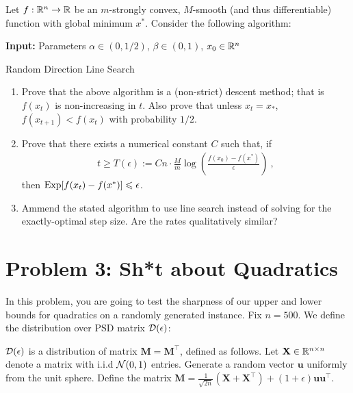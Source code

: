 \documentclass[12pt]{article}
\begin{document}
	Let $f: \mathbb{R}^n \to \mathbb{R}$ be an $m$-strongly convex, $M$-smooth (and thus differentiable) function with global minimum $x^*$. 
%
	Consider the following algorithm:

	\begin{algorithm}[H]
	\SetAlgoLined
	\textbf{Input:} Parameters $\alpha \in (0,1/2)$, $\beta \in (0,1)$, $x_0 \in \mathbb{R}^n$\;
	\caption{Random Direction Line Search}
	\end{algorithm}

\begin{enumerate}
	\item Prove that the above algorithm is a (non-strict) descent method; that is $f(x_t)$ is non-increasing in $t$. Also prove that unless $x_t = x_*$, $f(x_{t+1}) < f(x_t)$ with probability $1/2$. 
	\item Prove that there exists a numerical constant $C$ such that, if 
	\begin{eqnarray}
	t \ge T(\epsilon) := C n \cdot \frac{M}{m} \log (\frac{f(x_0) - f(x^*)}{\epsilon})~,
	\end{eqnarray}
	then $\mathrm{Exp}[f(x_t) - f(x^*)] \leqslant \epsilon$. 
	\item Ammend the stated algorithm to use line search instead of solving for the exactly-optimal step size. Are the rates qualitatively similar?
\end{enumerate}
\section*{Problem 3: Sh*t about Quadratics}
	In this problem, you are going to test the sharpness of our upper and lower bounds for quadratics on a randomly generated instance. Fix $n = 500$. We define the distribution over PSD matrix ${\cal D}(\epsilon)$:
	\begin{definition} ${\cal D}(\epsilon)$ is a distribution of matrix $\mathbf{M} = \mathbf{M}^\top$, defined as follows. Let $\mathbf{X} \in \mathbb{R}^{n \times n}$ denote a matrix with i.i.d ${\cal N}(0,1)$ entries. Generate a random vector $\mathbf{u}$ uniformly from the unit sphere. Define the matrix $\mathbf{M} = \frac{1}{\sqrt{2n}}(\mathbf{X} + \mathbf{X}^{\top}) + (1+\epsilon)\mathbf{u}\mathbf{u}^\top$.
	\end{definition}
\end{document}

